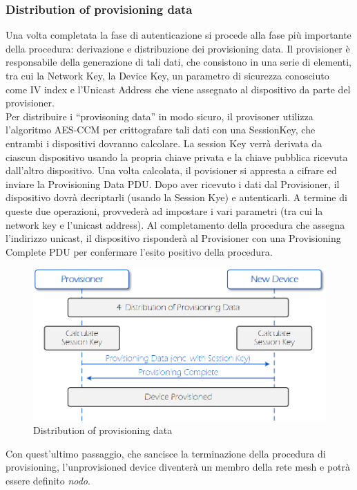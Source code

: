 \subsubsection{Distribution of provisioning data}
Una volta completata la fase di autenticazione si procede alla fase più importante della procedura: derivazione e distribuzione dei provisioning data. Il provisioner è responsabile della generazione di tali dati, che consistono in una serie di elementi, tra cui la Network Key, la Device Key, un parametro di sicurezza conosciuto come IV index e l'Unicast Address che viene assegnato al dispositivo da parte del provisioner.\\
Per distribuire i ``provisoning data'' in modo sicuro, il provisoner utilizza l'algoritmo AES-CCM per crittografare tali dati con una SessionKey, che entrambi i dispositivi dovranno calcolare. La session Key verrà derivata da ciascun dispositivo usando la propria chiave privata e la chiave pubblica ricevuta dall'altro dispositivo. Una volta calcolata, il povisioner si appresta a cifrare ed inviare la Provisioning Data PDU. 
Dopo aver ricevuto i dati dal Provisioner, il dispositivo dovrà decriptarli (usando la Session Kye) e autenticarli. A termine di queste due operazioni, provvederà ad impostare i vari parametri (tra cui la network key e l'unicast address). Al completamento della procedura che assegna l'indirizzo unicast, il dispositivo risponderà al Provisioner con una  Provisioning Complete PDU per confermare l'esito positivo della procedura.

\begin{figure}[!ht]
    \centering
    \includegraphics[width = \textwidth]{images/Provisioning_distribution_data.png}
    \caption{Distribution of provisioning data}
    \label{fig:provisioning_distribution_data}
\end{figure}

Con quest'ultimo passaggio, che sancisce la terminazione della procedura di provisioning, l'unprovisioned device diventerà un membro della rete mesh e potrà essere definito \textit{nodo}.

